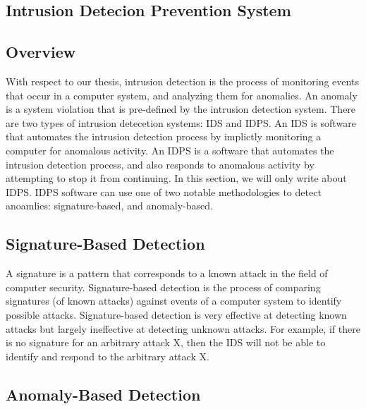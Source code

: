 \documentclass{report}
\begin{document}
\begin{spacing}{1.5}
\section{Intrusion Detecion Prevention System}

\subsection{Overview}

{\large
With respect to our thesis, intrusion detection is the process of monitoring events that occur in a computer system, and analyzing them for anomalies. An anomaly is a system violation that is pre-defined by the intrusion detection system. There are two types of intrusion detecetion systems: IDS and IDPS. An IDS is software that automates the intrusion detection process by implictly monitoring a computer for anomalous activity. An IDPS is a software that automates the intrusion detection process, and also responds to anomalous activity by attempting to stop it from continuing. In this section, we will only write about IDPS. IDPS software can use one of two notable methodologies to detect anoamlies: signature-based, and anomaly-based.
\newline
}


\subsection{Signature-Based Detection}

{\large
A signature is a pattern that corresponds to a known attack in the field of computer security. Signature-based detection is the process of comparing signatures (of known attacks) against events of a computer system to identify possible attacks. Signature-based detection is very effective at detecting known attacks but largely ineffective at detecting unknown attacks. For example, if there is no signature for an arbitrary attack X, then the IDS will not be able to identify and respond to the arbitrary attack X.
\newline
}


\subsection{Anomaly-Based Detection}


\end{spacing}
\end{document}
